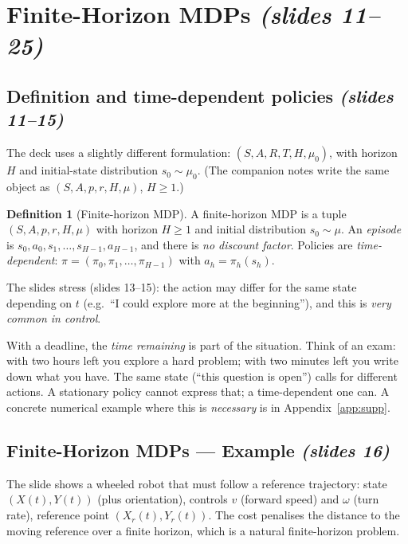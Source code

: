 \documentclass[11pt,a4paper]{article}
\newcommand{\slides}[1]{\emph{(slides #1)}}
\theoremstyle{plain}
\theoremstyle{definition}
\newtheorem{definition}[theorem]{Definition}
\theoremstyle{remark}
\begin{document}
\section{Finite-Horizon MDPs \slides{11--25}}

\subsection{Definition and time-dependent policies \slides{11--15}}

The deck uses a slightly different formulation: $(S,A,R,T,H,\mu_0)$, with horizon $H$ and initial-state distribution $s_0\sim\mu_0$. (The companion notes write the same object as $(S,A,p,r,H,\mu)$, $H\ge 1$.)

\begin{definition}[Finite-horizon MDP]\label{def:fhmdp}
A finite-horizon MDP is a tuple $(S,A,p,r,H,\mu)$ with horizon $H\ge1$ and initial distribution $s_0\sim\mu$. An \emph{episode} is $s_0,a_0,s_1,\dots,s_{H-1},a_{H-1}$, and there is \emph{no discount factor}. Policies are \emph{time-dependent}: $\pi=(\pi_0,\pi_1,\dots,\pi_{H-1})$ with $a_h=\pi_h(s_h)$.
\end{definition}

The slides stress (slides 13--15): the action may differ for the same state depending on $t$ (e.g.\ ``I could explore more at the beginning''), and this is \emph{very common in control}.

\begin{intuition}
With a deadline, the \emph{time remaining} is part of the situation. Think of an exam: with two hours left you explore a hard problem; with two minutes left you write down what you have. The same state (``this question is open'') calls for different actions. A stationary policy cannot express that; a time-dependent one can. A concrete numerical example where this is \emph{necessary} is in Appendix~\ref{app:supp}.
\end{intuition}

\subsection{Finite-Horizon MDPs --- Example \slides{16}}

The slide shows a wheeled robot that must follow a reference trajectory: state $(X(t),Y(t))$ (plus orientation), controls $v$ (forward speed) and $\omega$ (turn rate), reference point $(X_r(t),Y_r(t))$. The cost penalises the distance to the moving reference over a finite horizon, which is a natural finite-horizon problem.
\end{document}
